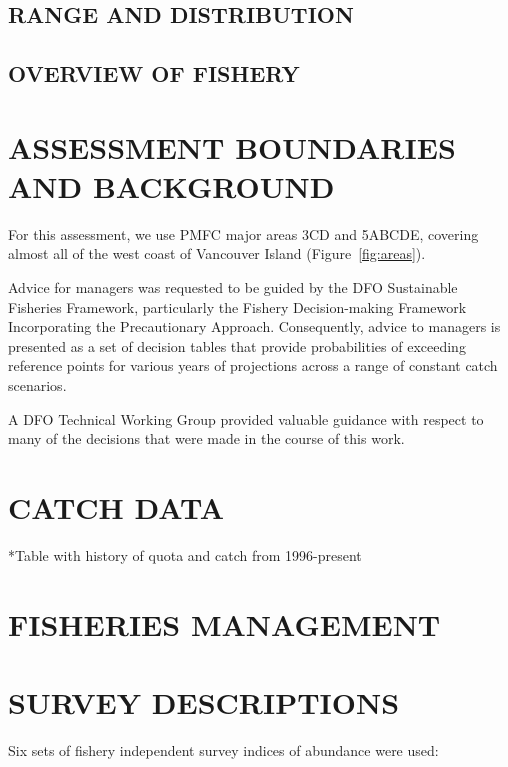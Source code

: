 \subsection{RANGE AND DISTRIBUTION}


\subsection{OVERVIEW OF FISHERY}


\section{ASSESSMENT BOUNDARIES AND BACKGROUND}

For this assessment, we use PMFC major areas 3CD and 5ABCDE, covering almost all of the west coast of Vancouver Island (Figure~\ref{fig:areas}).

Advice for managers was requested to be guided by the DFO Sustainable Fisheries Framework, particularly the Fishery Decision-making Framework Incorporating the Precautionary Approach. Consequently, advice to managers is presented as a set of decision tables that provide probabilities of exceeding reference points for various years of projections across a range of constant catch scenarios.

A DFO Technical Working Group provided valuable guidance with respect to many of the decisions that were made in the course of this work.

\section{CATCH DATA}
*Table with history of quota and catch from 1996-present

\section{FISHERIES MANAGEMENT}

\clearpage

\section{SURVEY DESCRIPTIONS}

Six sets of fishery independent survey indices of abundance were used:

